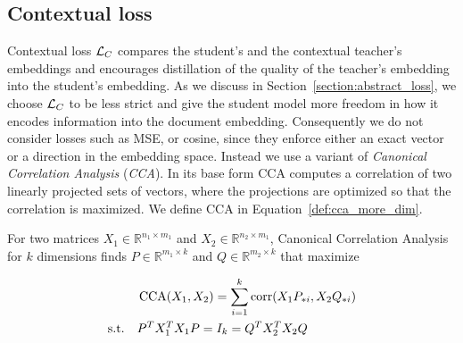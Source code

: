\subsection{Contextual loss}\label{section:contextual_loss}

Contextual loss $\mathcal{L}_C$ compares the student's and the contextual teacher's
embeddings and encourages distillation of the quality of the teacher's
embedding into the student's embedding. As we discuss in
Section~\ref{section:abstract_loss}, we choose $\mathcal{L}_C$ to be less strict and
give the student model more freedom in how it encodes information into the
document embedding. Consequently we do not consider losses such as MSE, or
cosine, since they enforce either an exact vector or a direction in the
embedding space. Instead we use a variant of \emph{Canonical Correlation
Analysis} \citep{hotelling1992relations} (\emph{CCA}). In its base form CCA
computes a correlation of two linearly projected sets of vectors, where the
projections are optimized so that the correlation is maximized. We define CCA
in Equation~\ref{def:cca_more_dim}.

\begin{defn}\label{def:cca_more_dim}

  For two matrices $X_1 \in \mathbb{R}^{n_1 \times m_1}$ and $X_2 \in
  \mathbb{R}^{n_2 \times m_1}$, Canonical Correlation Analysis for $k$
  dimensions finds $P \in \mathbb{R}^{m_1 \times k}$ and $Q \in \mathbb{R}^{m_2
  \times k}$ that maximize

  \begin{equation}
    \begin{split}
      &\operatorname*{CCA}(X_1, X_2) = \sum_{i = 1}^k \operatorname*{corr}(X_1P_{*i}, X_2Q_{*i}) \\
      \text{s.t.}\quad &P^TX_1^TX_1P = I_k = Q^TX_2^TX_2Q \\
    \end{split}
  \end{equation}


\end{defn}

